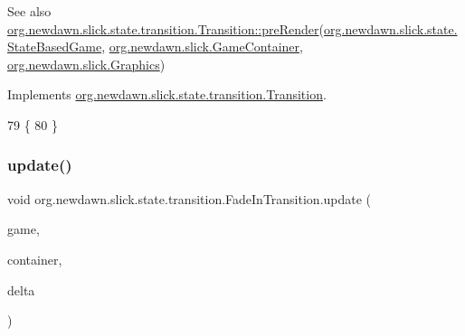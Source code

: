 \begin{DoxySeeAlso}{See also}
\mbox{\hyperlink{interfaceorg_1_1newdawn_1_1slick_1_1state_1_1transition_1_1_transition_ab8b0668c059830d938575d1a0b08bd93}{org.\+newdawn.\+slick.\+state.\+transition.\+Transition\+::pre\+Render}}(\mbox{\hyperlink{classorg_1_1newdawn_1_1slick_1_1state_1_1_state_based_game}{org.\+newdawn.\+slick.\+state.\+State\+Based\+Game}}, \mbox{\hyperlink{classorg_1_1newdawn_1_1slick_1_1_game_container}{org.\+newdawn.\+slick.\+Game\+Container}}, \mbox{\hyperlink{classorg_1_1newdawn_1_1slick_1_1_graphics}{org.\+newdawn.\+slick.\+Graphics}}) 
\end{DoxySeeAlso}


Implements \mbox{\hyperlink{interfaceorg_1_1newdawn_1_1slick_1_1state_1_1transition_1_1_transition_ab8b0668c059830d938575d1a0b08bd93}{org.\+newdawn.\+slick.\+state.\+transition.\+Transition}}.


\begin{DoxyCode}
79                                                                                     \{
80     \}
\end{DoxyCode}
\mbox{\label{classorg_1_1newdawn_1_1slick_1_1state_1_1transition_1_1_fade_in_transition_ac5e00c42c8595a375d284e1d8b0c2b93}} 
\subsubsection{\texorpdfstring{update()}{update()}}
{\footnotesize\ttfamily void org.\+newdawn.\+slick.\+state.\+transition.\+Fade\+In\+Transition.\+update (\begin{DoxyParamCaption}\item[{\mbox{\hyperlink{classorg_1_1newdawn_1_1slick_1_1state_1_1_state_based_game}{State\+Based\+Game}}}]{game,  }\item[{\mbox{\hyperlink{classorg_1_1newdawn_1_1slick_1_1_game_container}{Game\+Container}}}]{container,  }\item[{int}]{delta }\end{DoxyParamCaption})\hspace{0.3cm}{\ttfamily [inline]}}

